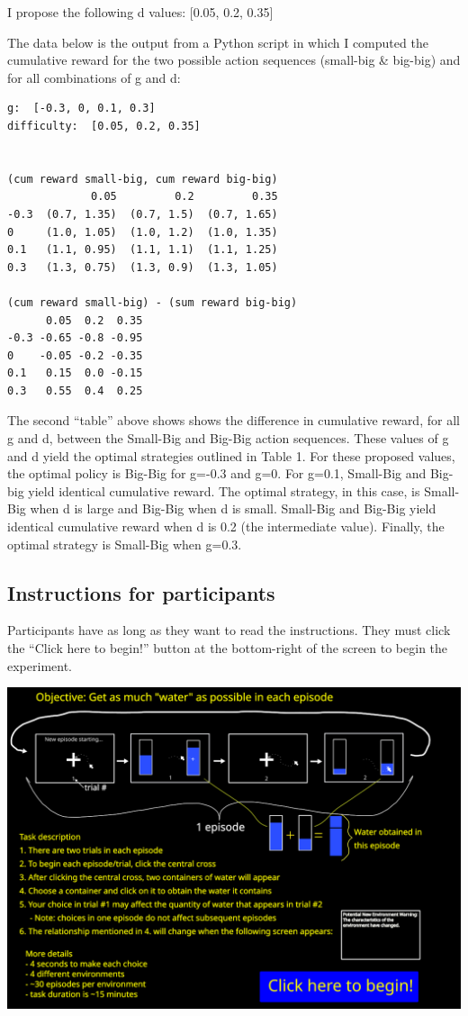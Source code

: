 \documentclass[11pt]{article}
\begin{document}
I propose the following d values: [0.05, 0.2, 0.35]

The data below is the output from a Python script in which I computed the cumulative reward for the two possible action sequences (small-big \& big-big) and for all combinations of g and d:

\label{}
\begin{verbatim}
g:  [-0.3, 0, 0.1, 0.3]
difficulty:  [0.05, 0.2, 0.35]


(cum reward small-big, cum reward big-big)
             0.05         0.2         0.35
-0.3  (0.7, 1.35)  (0.7, 1.5)  (0.7, 1.65)
0     (1.0, 1.05)  (1.0, 1.2)  (1.0, 1.35)
0.1   (1.1, 0.95)  (1.1, 1.1)  (1.1, 1.25)
0.3   (1.3, 0.75)  (1.3, 0.9)  (1.3, 1.05) 

(cum reward small-big) - (sum reward big-big)
      0.05  0.2  0.35
-0.3 -0.65 -0.8 -0.95
0    -0.05 -0.2 -0.35
0.1   0.15  0.0 -0.15
0.3   0.55  0.4  0.25
\end{verbatim}

The second ``table'' above shows shows the difference in cumulative reward, for all g and d, between the Small-Big and Big-Big action sequences. These values of g and d yield the optimal strategies outlined in Table 1. For these proposed values, the optimal policy is Big-Big for g=-0.3 and g=0. For g=0.1, Small-Big and Big-big yield identical cumulative reward.  The optimal strategy, in this case, is Small-Big when d is large and Big-Big when d is small. Small-Big and Big-Big yield identical cumulative reward when d is 0.2 (the intermediate value). Finally, the optimal strategy is Small-Big when g=0.3.
\subsection{Instructions for participants}
\label{sec:orgcf618a0}
Participants have as long as they want to read the instructions. They must click the ``Click here to begin!'' button at the bottom-right of the screen to begin the experiment.
\begin{center}
\includegraphics[width=.9\linewidth]{./img/instructions.png}
\end{center}
\end{document}
